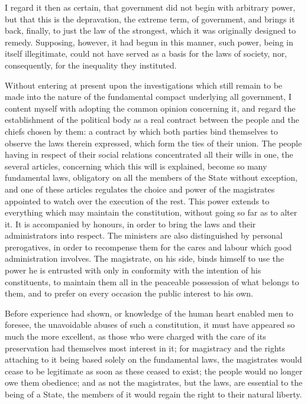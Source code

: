 \documentclass[12pt]{report}
\begin{document}
I regard it then as certain, that government did not begin with arbitrary power, but that this is the depravation, the extreme term, of government, and brings it back, finally, to just the law of the strongest, which it was originally designed to remedy. Supposing, however, it had begun in this manner, such power, being in itself illegitimate, could not have served as a basis for the laws of society, nor, consequently, for the inequality they instituted.

Without entering at present upon the investigations which still remain to be made into the nature of the fundamental compact underlying all government, I content myself with adopting the common opinion concerning it, and regard the establishment of the political body as a real contract between the people and the chiefs chosen by them: a contract by which both parties bind themselves to observe the laws therein expressed, which form the ties of their union. The people having in respect of their social relations concentrated all their wills in one, the several articles, concerning which this will is explained, become so many fundamental laws, obligatory on all the members of the State without exception, and one of these articles regulates the choice and power of the magistrates appointed to watch over the execution of the rest. This power extends to everything which may maintain the constitution, without going so far as to alter it. It is accompanied by honours, in order to bring the laws and their administrators into respect. The ministers are also distinguished by personal prerogatives, in order to recompense them for the cares and labour which good administration involves. The magistrate, on his side, binds himself to use the power he is entrusted with only in conformity with the intention of his constituents, to maintain them all in the peaceable possession of what belongs to them, and to prefer on every occasion the public interest to his own.

Before experience had shown, or knowledge of the human heart enabled men to foresee, the unavoidable abuses of such a constitution, it must have appeared so much the more excellent, as those who were charged with the care of its preservation had themselves most interest in it; for magistracy and the rights attaching to it being based solely on the fundamental laws, the magistrates would cease to be legitimate as soon as these ceased to exist; the people would no longer owe them obedience; and as not the magistrates, but the laws, are essential to the being of a State, the members of it would regain the right to their natural liberty.
\end{document}

